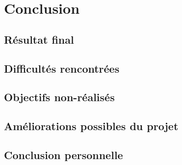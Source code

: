 \chapter{Conclusion}

\section{Résultat final}

\lipsum[1]

\section{Difficultés rencontrées}

\lipsum[2]

\section{Objectifs non-réalisés}

\lipsum[3]

\section{Améliorations possibles du projet}

\lipsum[4]

\section{Conclusion personnelle}

\lipsum[5]
